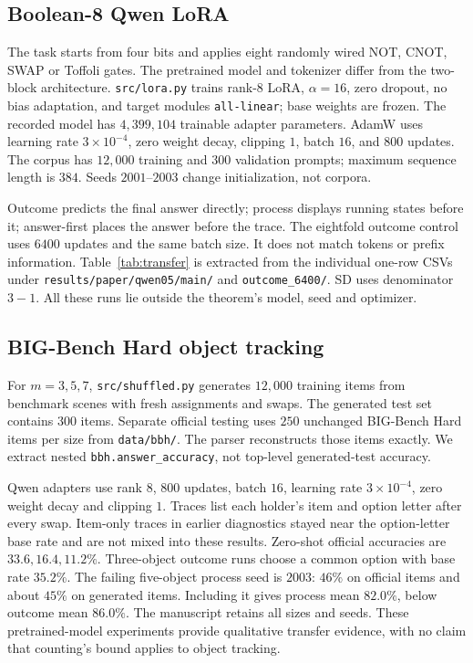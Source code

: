 \subsection{Boolean-8 Qwen LoRA}
The task starts from four bits and applies eight randomly wired NOT, CNOT, SWAP or Toffoli gates. The pretrained model and tokenizer differ from the two-block architecture. \texttt{src/lora.py} trains rank-$8$ LoRA, $\alpha=16$, zero dropout, no bias adaptation, and target modules \texttt{all-linear}; base weights are frozen. The recorded model has $4{,}399{,}104$ trainable adapter parameters. AdamW uses learning rate $3\times10^{-4}$, zero weight decay, clipping $1$, batch $16$, and $800$ updates. The corpus has $12{,}000$ training and $300$ validation prompts; maximum sequence length is $384$. Seeds $2001$--$2003$ change initialization, not corpora.

Outcome predicts the final answer directly; process displays running states before it; answer-first places the answer before the trace. The eightfold outcome control uses $6400$ updates and the same batch size. It does not match tokens or prefix information. Table~\ref{tab:transfer} is extracted from the individual one-row CSVs under \texttt{results/paper/qwen05/main/} and \texttt{outcome\_6400/}. SD uses denominator $3-1$. All these runs lie outside the theorem's model, seed and optimizer.

\subsection{BIG-Bench Hard object tracking}
For $m=3,5,7$, \texttt{src/shuffled.py} generates $12{,}000$ training items from benchmark scenes with fresh assignments and swaps. The generated test set contains $300$ items. Separate official testing uses $250$ unchanged BIG-Bench Hard items per size from \texttt{data/bbh/}. The parser reconstructs those items exactly. We extract nested \texttt{bbh.answer\_accuracy}, not top-level generated-test accuracy.

Qwen adapters use rank $8$, $800$ updates, batch $16$, learning rate $3\times10^{-4}$, zero weight decay and clipping $1$. Traces list each holder's item and option letter after every swap. Item-only traces in earlier diagnostics stayed near the option-letter base rate and are not mixed into these results. Zero-shot official accuracies are $33.6,16.4,11.2\%$. Three-object outcome runs choose a common option with base rate $35.2\%$. The failing five-object process seed is $2003$: $46\%$ on official items and about $45\%$ on generated items. Including it gives process mean $82.0\%$, below outcome mean $86.0\%$. The manuscript retains all sizes and seeds. These pretrained-model experiments provide qualitative transfer evidence, with no claim that counting's bound applies to object tracking.

